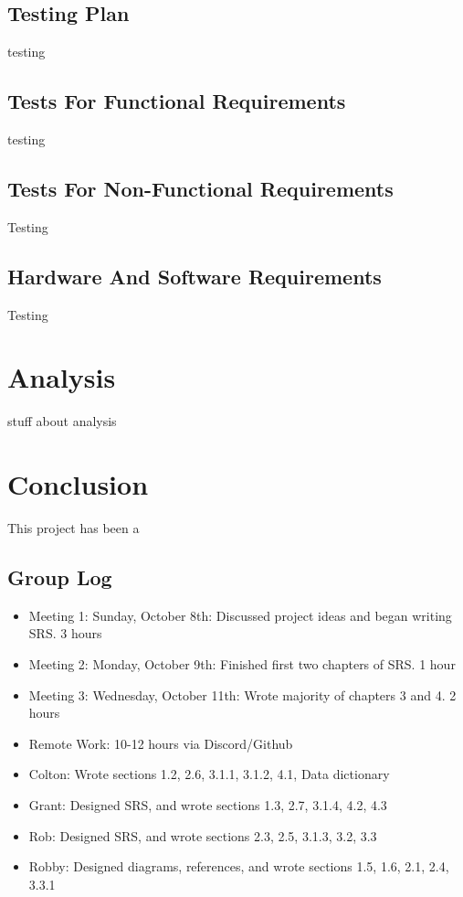 \documentclass[11pt]{report}
\begin{document}
\section{Testing Plan}
testing


\section{Tests For Functional Requirements}
testing


\section{Tests For Non-Functional Requirements}
Testing

\section{Hardware And Software Requirements}
Testing



\chapter{Analysis}
stuff about analysis



\chapter{Conclusion}
This project has been a 



\begin{appendices}

    \chapter{Group Log}
    \begin{itemize}
        \item Meeting 1: Sunday, October 8th: Discussed project ideas and began writing SRS. 3 hours
        \item Meeting 2: Monday, October 9th: Finished first two chapters of SRS. 1 hour
        \item Meeting 3: Wednesday, October 11th: Wrote majority of chapters 3 and 4. 2 hours
        \item Remote Work: 10-12 hours via Discord/Github
        \item Colton: Wrote sections 1.2, 2.6, 3.1.1, 3.1.2, 4.1, Data dictionary
        \item Grant: Designed SRS, and wrote sections 1.3, 2.7, 3.1.4, 4.2, 4.3
        \item Rob: Designed SRS, and wrote sections 2.3, 2.5, 3.1.3, 3.2, 3.3
        \item Robby: Designed diagrams, references, and wrote sections 1.5, 1.6, 2.1, 2.4, 3.3.1
    \end{itemize}


\end{appendices}
\end{document}
